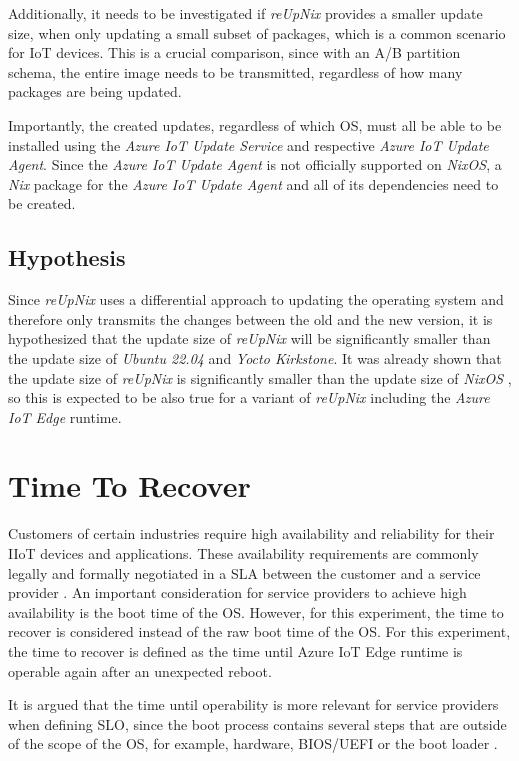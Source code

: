 Additionally, it needs to be investigated if \textit{reUpNix} provides a smaller
update size, when only updating a small subset of packages, which is a common
scenario for \ac{IoT} devices. This is a crucial comparison, since with an
A/B partition schema, the entire image needs to be transmitted, regardless of
how many packages are being updated.

Importantly, the created updates, regardless of which \ac{OS}, must all be
able to be installed using the \textit{Azure IoT Update Service} and respective
\textit{Azure IoT Update Agent}. Since the \textit{Azure IoT Update Agent} is
not officially supported on \textit{NixOS}, a \textit{Nix} package
for the \textit{Azure IoT Update Agent} and all of its dependencies need to be created.

\subsection{Hypothesis}

Since \textit{reUpNix} uses a differential approach to updating the operating
system and therefore only transmits the changes between the old and the new
version, it is hypothesized that the update size of \textit{reUpNix} will be
significantly smaller than the update size of \textit{Ubuntu 22.04} and
\textit{Yocto Kirkstone}. It was already shown that the update size of
\textit{reUpNix} is significantly smaller than the update size of \textit{NixOS}
\cite{gollenstede:23:lctes}, so this is expected to be also true for a variant
of \textit{reUpNix} including the \textit{Azure IoT Edge} runtime.

\section{Time To Recover}
\label{sec:time-to-recover}
Customers of certain industries require high availability and reliability for
their \ac{IIoT} devices and applications. These availability requirements
are commonly legally and formally negotiated in a \ac{SLA} between
the customer and a service provider \cite{msdoc-slas}. An important consideration
for service providers to achieve high availability is the boot time of the
\ac{OS}. However, for this experiment, the time to recover is considered
instead of the raw boot time of the \ac{OS}. For this experiment, the time to recover
is defined as the time until Azure IoT Edge runtime is operable again after
an unexpected reboot.

It is argued that the time until operability is more relevant for service providers
when defining \ac{SLO}, since the boot process contains several steps that are
outside of the scope of the \ac{OS}, for example, hardware, BIOS/UEFI or the boot
loader \cite{almesberg}.

